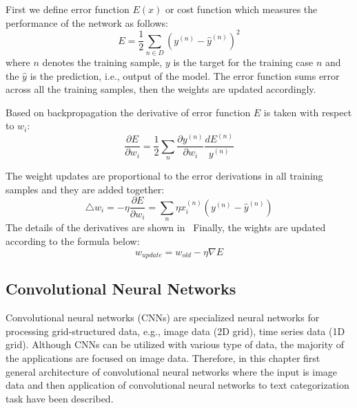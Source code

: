 First we define error function $E(x)$ or cost function which measures the performance of the network as follows:%
\begin{equation}
    E= \frac{1}{2}\sum_{n\in D} (y^{(n)}-\hat{y}^{(n)})^2
\end{equation}
where $n$ denotes the training sample, $y$ is the target for the training case $n$ and the $\hat{y}$ is the prediction, i.e., output of the model. The error function sums error across all the training samples, then the weights are updated accordingly. 

Based on backpropagation the derivative of error function $E$ is taken with respect to $w_i$:
\begin{equation}
    \frac{\partial E}{\partial w_i}=\frac{1}{2}\sum_{n} \frac{\partial y^{(n)}}{\partial w_i} \frac{dE^{(n)}}{y^{(n)}}
\end{equation}

The weight updates are proportional to the error derivations in all training samples and they are added together:
\begin{equation}
    \triangle w_i = - \eta \frac{\partial E}{\partial w_i} = \sum_{n} \eta x_i^{(n)} (y^{(n)} - \hat{y}^{(n)})
\end{equation}
The details of the derivatives are shown in~\cite{}
Finally, the wights are updated according to the formula below:
\begin{equation}
   w_{update}= w_{old}-\eta \nabla E
\end{equation}
    
\subsection{Convolutional Neural Networks}
Convolutional neural networks (CNNs) are specialized neural networks for processing grid-structured data, e.g., image data (2D grid), time series data (1D grid). Although CNNs can be utilized with various type of data, the majority of the applications are focused on image data. Therefore, in this chapter first general architecture of convolutional neural networks where the input is image data and then application of convolutional neural networks to text categorization task have been described. 

